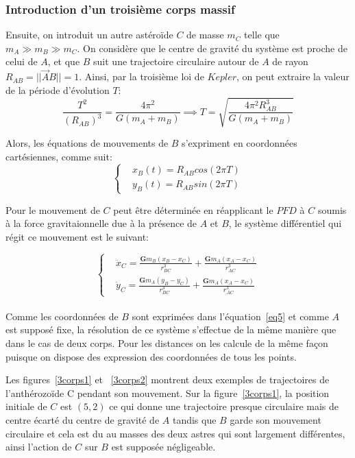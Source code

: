 \documentclass{article}
\begin{document}
\subsubsection{ Introduction d'un troisième corps massif}
Ensuite, on introduit un autre astéroïde $C$ de masse $m_{C}$ telle que $m_{A} \gg m_{B} \gg m_{C}$. On considère que le centre de gravité du système est proche de celui de $A$, et que $B$ suit une trajectoire circulaire autour de $A$ de rayon $R_{AB} = ||\overrightarrow AB|| = 1$. Ainsi, par la troisième loi de $Kepler$, on peut extraire la valeur de la période d'évolution $T$:
\[\frac{T^2}{(R_{AB})^3} = \frac{4\pi^2}{G(m_{A}+m_{B})} \implies T = \sqrt{\frac{4\pi^2 R_{AB}^{3}}{G(m_{A}+m_{B})}}  \] 

Alors, les équations de mouvements de $B$ s'expriment en coordonnées cartésiennes, comme suit:
\begin{equation}\label{eq5}
\left\{
\begin{aligned}
& x_{B}(t) = R_{AB} cos(2\pi T) \\
&  y_{B}(t) = R_{AB} sin(2\pi T) 
\end{aligned}
\right.
\end{equation}

Pour le mouvement de $C$ peut être déterminée en réapplicant le $PFD$ à $C$ soumis à la force gravitaionnelle due à la présence de $A$ et $B$, le système différentiel qui régit ce mouvement est le suivant:


\begin{equation}\label{eq6}
\left\{
\begin{aligned}
& \ddot x_{C}  = \frac{\mathbf{G} m_{B} (x_{B} - x_{C}) }{r_{BC}^{3}} + \frac{\mathbf{G} m_{A} (x_{A} - x_{C}) }{r_{AC}^{3}} \\
& \ddot y_{C}  = \frac{\mathbf{G} m_{A} (y_{B} - y_{C}) }{r_{BC}^{3}} + \frac{\mathbf{G} m_{A} (x_{A} - x_{C}) }{r_{AC}^{3}}
\end{aligned}
\right.
\end{equation}\\


Comme les coordonnées de $B$ sont exprimées dans l'équation~\ref{eq5} et comme $A$ est supposé fixe, la résolution de ce système s'effectue de la même manière que dans le cas de deux corps. Pour les distances on les calcule de la même façon puisque on dispose des expression des coordonnées de tous les points.

Les figures~\ref{3corps1} et ~\ref{3corps2} montrent deux exemples de trajectoires de l'anthérozoïde C pendant son mouvement. Sur la figure~\ref{3corps1}, la position initiale de $C$ est $(5,2)$ ce qui donne une trajectoire presque circulaire mais de centre écarté du centre de gravité de $A$ tandis que $B$ garde son mouvement circulaire et cela est du au masses des deux astres qui sont largement différentes, ainsi l'action de $C$ sur $B$ est supposée négligeable.
\end{document}
